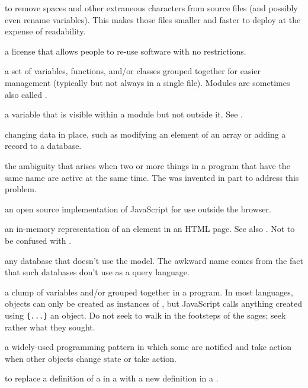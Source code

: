 \begin{description}
to remove spaces and other extraneous characters from source files (and
possibly even rename variables). This makes those files smaller and faster to
deploy at the expense of readability.

a license that allows people to re-use software with no restrictions.

a set of variables, functions, and/or classes grouped together for easier
management (typically but not always in a single file). Modules are sometimes
also called .

a variable that is visible within a module but not outside it. See
.

changing data in place, such as modifying an element of an array or adding a
record to a database.

the ambiguity that arises when two or more things in a program that have the
same name are active at the same time. The  was
invented in part to address this problem.

an open source implementation of JavaScript for use outside the browser.

an in-memory representation of an element in an HTML page. See also
. Not to be confused with .

any database that doesn't use the  model.
The awkward name comes from the fact that such databases don't use
 as a query language.

a clump of variables and/or  grouped together in a
program. In most languages, objects can only be created as instances of
, but JavaScript calls anything created using \texttt{\{...\}} an
object. Do not seek to walk in the footsteps of the sages; seek rather what
they sought.

a widely-used programming pattern in which some  are
notified and take action when other objects change state or take action.

to replace a definition of a  in a 
with a new definition in a .


\end{description}
